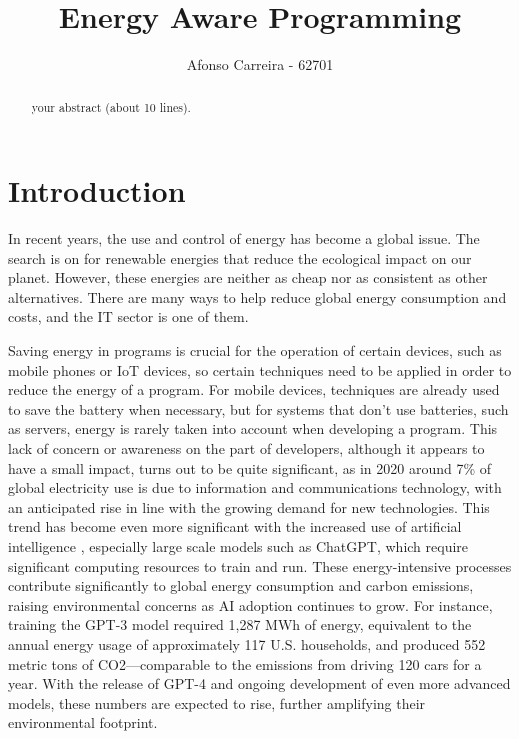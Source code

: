 \documentclass[sigplan]{acmart}
\begin{document}
\title{Energy Aware Programming}

\author{Afonso Carreira - 62701}


\begin{abstract}
  your abstract (about 10 lines).
\end{abstract}



\pagestyle{plain} %

\maketitle
\section{Introduction}

In recent years, the use and control of energy has become a global issue. The search is on for renewable energies that reduce the ecological impact on our planet. However, these energies are neither as cheap nor as consistent as other alternatives. There are many ways to help reduce global energy consumption and costs, and the IT sector is one of them.

Saving energy in programs is crucial for the operation of certain devices, such as mobile phones or IoT devices, so certain techniques need to be applied in order to reduce the energy of a program. For mobile devices, techniques are already used to save the battery when necessary, but for systems that don't use batteries, such as servers, energy is rarely taken into account when developing a program.
This lack of concern or awareness on the part of developers, although it appears to have a small impact, turns out to be quite significant, as in 2020 around 7\% of global electricity use is due to information and communications technology, with an anticipated rise in line with the growing demand for new technologies\cite{article}. This trend has become even more significant with the increased use of artificial intelligence \cite{patterson2021carbon}, especially large scale models such as ChatGPT, which require significant computing resources to train and run. These energy-intensive processes contribute significantly to global energy consumption and carbon emissions, raising environmental concerns as AI adoption continues to grow. For instance, training the GPT-3 model required 1,287 MWh of energy, equivalent to the annual energy usage of approximately 117 U.S. households, and produced 552 metric tons of CO2—comparable to the emissions from driving 120 cars for a year. With the release of GPT-4 and ongoing development of even more advanced models, these numbers are expected to rise, further amplifying their environmental footprint.
\end{document}
